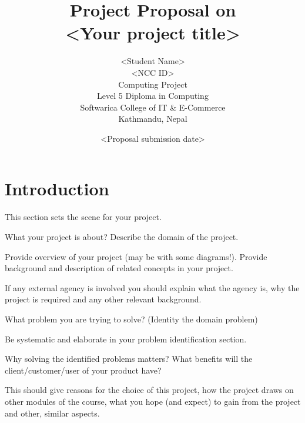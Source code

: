 \documentclass[12pt, a4paper]{report}
\begin{document}
\title{Project Proposal on\\
\bf{\textless Your project title\textgreater}}
\author{\textless Student Name\textgreater\\
\textless NCC ID\textgreater\\
Computing Project \\
Level 5 Diploma in Computing \\
Softwarica College of IT \& E-Commerce \\
Kathmandu, Nepal
}
\date{\textless Proposal submission date\textgreater}

\maketitle



\tableofcontents



\chapter{Introduction} %
\label{cha:introduction}

This section sets the scene for your project.

What your project is about? Describe the domain of the project.

Provide overview of your project (may be with some diagrams!). Provide background and description of related concepts in your project.

If any external agency is involved you should explain what the agency is, why the project is required and any other relevant background.

What problem you are trying to solve? (Identity the domain problem)

Be systematic and elaborate in your problem identification section.

Why solving the identified problems matters? What benefits will the client/customer/user of your product have?

This should give reasons for the choice of this project, how the project draws on other modules of the course, what you hope (and expect) to gain from the project and other, similar aspects.
\end{document}
